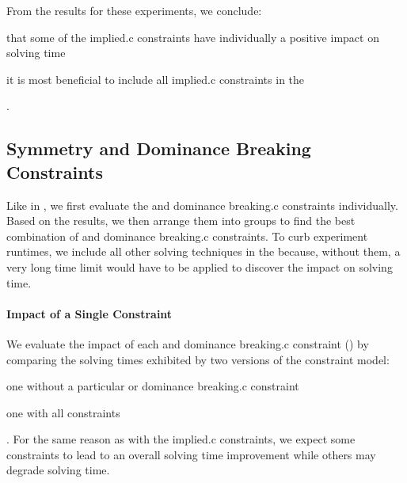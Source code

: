 From the results for these experiments, we conclude:
%
\begin{enumerate*}[label=(\roman*), itemjoin={;\ }, itemjoin*={; but\ }]
  \item that some of the \gls{implied.c} \glspl{constraint} have individually a
    positive impact on solving time
  \item it is most beneficial to include all \gls{implied.c} \glspl{constraint}
    in the 
\end{enumerate*}.


\subsection{Symmetry and Dominance Breaking Constraints}

Like in , we first evaluate
the  and \gls{dominance breaking.c}
\glspl{constraint} individually.
%
Based on the results, we then arrange them into groups to find the best
combination of  and \gls{dominance breaking.c}
\glspl{constraint}.
%
To curb experiment runtimes, we include all other solving techniques in the
 because, without them, a very long time limit
would have to be applied to discover the impact on solving time.


\paragraph{Impact of a Single Constraint}

We evaluate the impact of each  and \gls{dominance
  breaking.c} \gls{constraint}
() by
comparing the solving times exhibited by two versions of the \gls{constraint
  model}:
%
\begin{modelList}
  \item {}
    one without a particular  or \gls{dominance
      breaking.c} \gls{constraint}
  \item {}
    one with all \glspl{constraint}
\end{modelList}.
%
For the same reason as with the \gls{implied.c} \glspl{constraint}, we expect
some \glspl{constraint} to lead to an overall solving time improvement while
others may degrade solving time.

